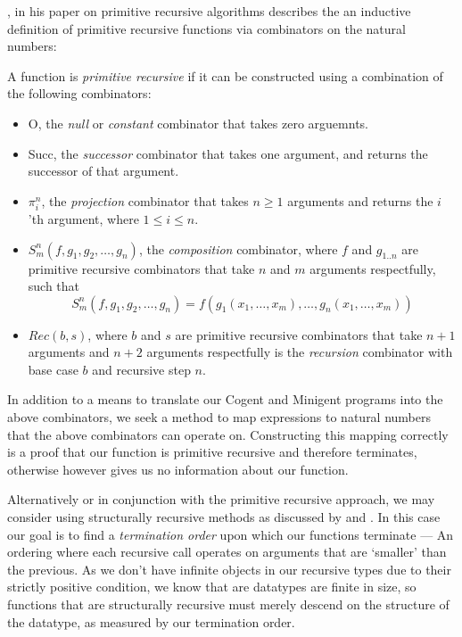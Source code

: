 \citet{AboutPrimrecAlgorithms}, in his paper on primitive recursive algorithms describes the
an inductive definition of primitive recursive functions via combinators on the natural numbers:

\theoremstyle{definition}
\begin{definition}
    \label{def:primrec}
    A function is \textit{primitive recursive} if it can be constructed using 
    a combination of the following combinators:

    \begin{itemize}
        \item 
            \textsf{O}, the \textit{null} or \textit{constant} combinator that takes zero arguemnts.
        \item 
            \textsf{Succ}, the \textit{successor} combinator that takes one argument, and returns the successor
            of that argument.
        \item 
            \textsf{$\pi^n_i$}, the \textit{projection} combinator that takes $n \geq 1$ arguments and returns
            the $i$'th argument, where $1 \leq i \leq n$.
        \item 
            \textsf{$S^n_m(f, g_1, g_2, \dots, g_n)$}, the \textit{composition} combinator, where $f$ and $g_{1..n}$ are 
            primitive recursive combinators that take $n$ and $m$ arguments respectfully, such that 
                $$S^n_m(f, g_1, g_2, \dots, g_n) = f(g_1(x_1, \dots, x_m), \dots, g_n(x_1, \dots, x_m))$$
        \item 
            \textsf{$Rec(b,s)$}, where $b$ and $s$ are primitive recursive combinators that take
            $n + 1$ arguments and $n + 2$ arguments respectfully is the \textit{recursion}
            combinator with base case $b$ and recursive step $n$.
    \end{itemize}
\end{definition}

In addition to a means to translate our Cogent and Minigent programs into the above combinators,
we seek a method to map expressions to natural numbers that the above combinators can
operate on. Constructing this mapping correctly is a proof that our function is primitive recursive and
therefore terminates, otherwise however gives us no information about our function.

Alternatively or in conjunction with the primitive recursive approach, we may consider using
structurally recursive methods as discussed by \citet{StrucrecStructures} and \citet{PredicateStructrec}.
In this case our goal is to find a \textit{termination order} upon which our functions terminate --- An ordering
where each recursive call operates on arguments that are `smaller' than the previous. 
As we don't have infinite objects in our recursive types due to their strictly positive condition, 
we know that are datatypes are finite in size, so functions that are  structurally recursive must
merely descend on the structure of the datatype, as measured by our termination order.

